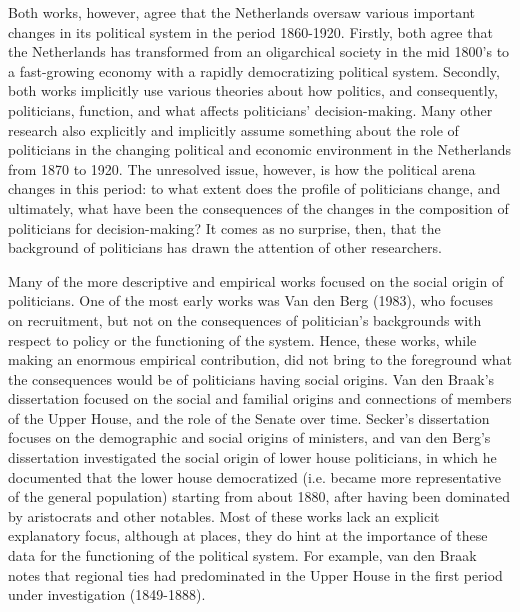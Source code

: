     Both works, however, agree that the Netherlands oversaw various important changes in its political system in the period 1860-1920. Firstly, both agree that the Netherlands has transformed from an oligarchical society in the mid 1800’s to a fast-growing economy with a rapidly democratizing political system. Secondly, both works implicitly use various theories about how politics, and consequently, politicians, function, and what affects politicians’ decision-making. Many other research also explicitly and implicitly assume something about the role of politicians in the changing political and economic environment in the Netherlands from 1870 to 1920. The unresolved issue, however, is how the political arena changes in this period: to what extent does the profile of politicians change, and ultimately, what have been the consequences of the changes in the composition of politicians for decision-making? It comes as no surprise, then, that the background of politicians has drawn the attention of other researchers. 

    Many of the more descriptive and empirical works focused on the social origin of politicians. One of the most early works was Van den Berg (1983), who focuses on recruitment, but not on the consequences of politician’s backgrounds with respect to policy or the functioning of the system. Hence, these works, while making an enormous empirical contribution, did not bring to the foreground what the consequences would be of politicians having social origins. Van den Braak’s dissertation focused on the social and familial origins and connections of members of the Upper House, and the role of the Senate over time.\autocite{van1999eerste} Secker’s dissertation focuses on the demographic and social origins of ministers, and van den Berg’s dissertation investigated the social origin of lower house politicians, in which he documented that the lower house democratized (i.e. became more representative of the general population) starting from about 1880, after having been dominated by aristocrats and other notables.\autocite{secker1991ministers,van1983toegang} Most of these works lack an explicit explanatory focus, although at places, they do hint at the importance of these data for the functioning of the political system. For example, van den Braak notes that regional ties had predominated in the Upper House in the first period under investigation (1849-1888).\autocite[p. 130]{van1999eerste}

